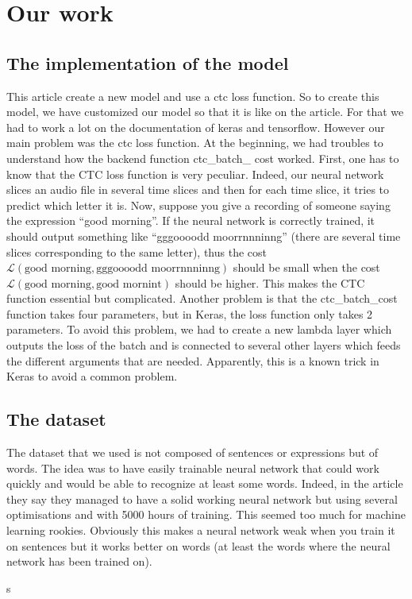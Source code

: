\documentclass[12pt]{article}
\begin{document}
\section{Our work}

\subsection{The implementation of the model}

This article \cite{article} create a new model and use a ctc loss function. So to create this model, we have customized our model so that it is like on the article. For that we had to work a lot on the documentation of keras and tensorflow. However our main problem was the ctc loss function. At the beginning, we had troubles to understand how the backend function ctc\_batch\_ cost worked. First, one has to know that the CTC loss function is very peculiar. Indeed, our neural network slices an audio file in several time slices and then for each time slice, it tries to predict which letter it is. Now, suppose you give a recording of someone saying the expression ``good morning''. If the neural network is correctly trained, it should output something like ``gggoooodd moorrnnninng'' (there are several time slices corresponding to the same letter), thus the cost $\mathcal{L}(\mbox{good morning}, \mbox{gggoooodd moorrnnninng})$ should be small when the cost $\mathcal{L}(\mbox{good morning}, \mbox{good mornint})$ should be higher. This makes the CTC function essential but complicated. Another problem is that the ctc\_batch\_cost function takes four parameters, but in Keras, the loss function only takes 2 parameters. To avoid this problem, we had to create a new lambda layer which outputs the loss of the batch and is connected to several other layers which feeds the different arguments that are needed. Apparently, this is a known trick in Keras to avoid a common problem.

\subsection{The dataset}

The dataset that we used is not composed of sentences or expressions but of words. The idea was to have easily trainable neural network that could work quickly and would be able to recognize at least some words. Indeed, in the article they say they managed to have a solid working neural network but using several optimisations and with 5000 hours of training. This seemed too much for machine learning rookies. Obviously this makes a neural network weak when you train it on sentences but it works better on words (at least the words where the neural network has been trained on).




s
\end{document}

